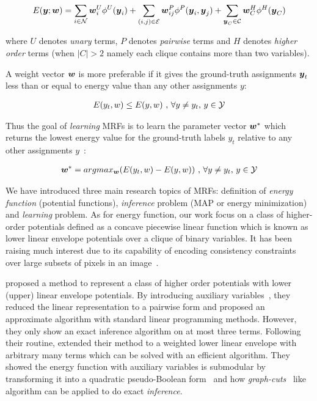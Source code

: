 \begin{align}
  \label{eq:energyfunction_UPH}
  E({\boldsymbol{y}};{\boldsymbol{w}})=\sum_{i\in {\cal N}}{{\boldsymbol{w}}_i^U\phi^U({\boldsymbol{y}}_i)}+
  \sum_{(i,j)\in {\cal E}}{{\boldsymbol{w}}_{ij}^P\phi^P({\boldsymbol{y}}_i,{\boldsymbol{y}}_j)}+
  \sum_{{\boldsymbol{y}}_C\in {\cal C}}{{\boldsymbol{w}}_C^H\phi^H({\boldsymbol{y}}_C)}
\end{align}

\noindent where $U$ denotes \emph{unary} terms, $P$ denotes
\emph{pairwise} terms and $H$ denotes \emph{higher order} terms
(when $|C|>2$ namely each clique contains more than two
variables).

A weight vector ${\boldsymbol{w}}$ is more preferable if it gives the
ground-truth assignments ${\boldsymbol{y}}_t$ less than or equal to energy
value than any other assignments $y$:

\begin{align}
E(y_t,w)\leq E(y,w)~ \text{,~}\forall y \neq y_t
\text{,~} y\in {\cal Y}
\end{align}


Thus the goal of \emph{learning} MRFs is to learn the parameter
vector ${\boldsymbol{w}}^*$ which returns the lowest energy value for the
ground-truth labels $y_t$ relative to any other assignments
$y$~\cite{Szummer:ECCV08}:

\begin{align}
{\boldsymbol{w}}^* = argmax_{{\boldsymbol{w}}}(E(y_t,w)-E(y,w))~ \text{,~}\forall y \neq y_t
\text{,~} y\in {\cal Y}
\end{align}

We have introduced three main research topics of MRFs:
definition of \emph{energy function} (potential functions),
\emph{inference} problem (MAP or energy minimization) and
\emph{learning} problem. As for energy function, our work focus
on a class of higher-order potentials defined as a concave
piecewise linear function which is known as lower linear envelope
potentials over a clique of binary variables. It has been raising
much interest due to its capability of encoding consistency
constraints over large subsets of pixels in an
image~\cite{Kohli:CVPR07,Nowozin:2011}.

 proposed a method to represent a class
of higher order potentials with lower (upper) linear envelope
potentials. By introducing auxiliary
variables~\cite{Kohli:CVPR10}, they reduced the linear
representation to a pairwise form and proposed an approximate
algorithm with standard linear programming methods. However, they
only show an exact inference algorithm on at most three terms.
Following their routine,  extended their
method to a weighted lower linear envelope with arbitrary many
terms which can be solved with an efficient algorithm. They
showed the energy function with auxiliary variables is submodular
by transforming it into a quadratic pseudo-Boolean
form~\cite{Boros:MATH02} and how
\emph{graph-cuts}~\cite{Hammer:1965, Boykov:ICCV01, Freedman:CVPR05} like
algorithm can be applied to do exact \emph{inference}.

